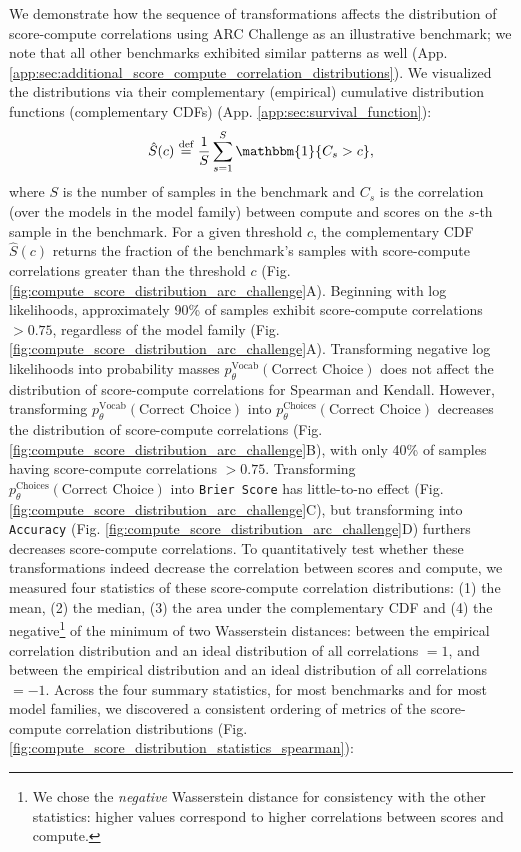 We demonstrate how the sequence of transformations affects the distribution of score-compute correlations using ARC Challenge \citep{clark2018arc} as an illustrative benchmark; we note that all other benchmarks exhibited similar patterns as well (App. \ref{app:sec:additional_score_compute_correlation_distributions}). We visualized the distributions via their complementary (empirical) cumulative distribution functions (complementary CDFs) (App. \ref{app:sec:survival_function}):
%
\begin{equation}
\hat{S}(c) \defeq \frac{1}{S} \sum_{s=1}^{S} \mathbbm{1}\{C_s > c\}
\label{eqn:empirical_survival_function},
\end{equation}
%
where $S$ is the number of samples in the benchmark and $C_s$ is the correlation (over the models in the model family) between compute and scores on the $s$-th sample in the benchmark. For a given threshold $c$, the complementary CDF $\hat{S}(c)$ returns the fraction of the benchmark's samples with score-compute correlations greater than the threshold $c$ (Fig. \ref{fig:compute_score_distribution_arc_challenge}A). Beginning with log likelihoods, approximately 90\% of samples exhibit score-compute correlations $> 0.75$, regardless of the model family (Fig. \ref{fig:compute_score_distribution_arc_challenge}A). Transforming negative log likelihoods into probability masses $p_{\theta}^{\text{Vocab}}(\text{Correct Choice})$ does not affect the distribution of score-compute correlations for Spearman and Kendall.
However, transforming $p_{\theta}^{\text{Vocab}}(\text{Correct Choice})$ into $p_{\theta}^{\text{Choices}}(\text{Correct Choice})$ decreases the distribution of score-compute correlations (Fig. \ref{fig:compute_score_distribution_arc_challenge}B), with only 40\% of samples having score-compute correlations $> 0.75$.
Transforming $p_{\theta}^{\text{Choices}}(\text{Correct Choice})$ into \texttt{Brier Score} has little-to-no effect (Fig. \ref{fig:compute_score_distribution_arc_challenge}C), but transforming into \texttt{Accuracy} (Fig. \ref{fig:compute_score_distribution_arc_challenge}D) furthers decreases score-compute correlations.
To quantitatively test whether these transformations indeed decrease the correlation between scores and compute, we measured four statistics of these score-compute correlation distributions: (1) the mean, (2) the median, (3) the area under the complementary CDF and (4) the negative\footnote{We chose the \textit{negative} Wasserstein distance for consistency with the other statistics: higher values correspond to higher correlations between scores and compute.} of the minimum of two Wasserstein distances: between the empirical correlation distribution and an ideal distribution of all correlations $=1$, and between the empirical distribution and an ideal distribution of all correlations $=-1$. Across the four summary statistics, for most benchmarks and for most model families, we discovered a consistent ordering of metrics of the score-compute correlation distributions (Fig. \ref{fig:compute_score_distribution_statistics_spearman}):
